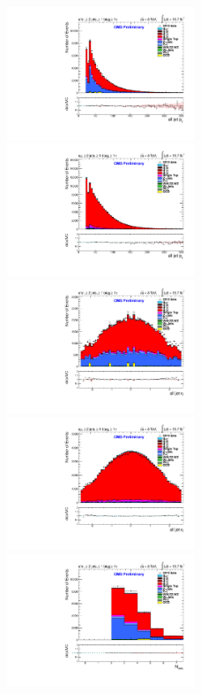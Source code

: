 \documentclass[oneside, a4paper, 11pt, ]{report}
\begin{document}
\begin{figure}
\includegraphics[width=0.5\textwidth]{Plots/ControlPlots/TTbarDiLeptonAnalysis/EE/Jets/all_jet_pT_splitTTbar_ratio.pdf}
\includegraphics[width=0.5\textwidth]{Plots/ControlPlots/TTbarDiLeptonAnalysis/EMu/Jets/all_jet_pT_splitTTbar_ratio.pdf}\\
\includegraphics[width=0.5\textwidth]{Plots/ControlPlots/TTbarDiLeptonAnalysis/EE/Jets/all_jet_eta_splitTTbar_ratio.pdf}
\includegraphics[width=0.5\textwidth]{Plots/ControlPlots/TTbarDiLeptonAnalysis/EMu/Jets/all_jet_eta_splitTTbar_ratio.pdf} \\
\includegraphics[width=0.5\textwidth]{Plots/ControlPlots/TTbarDiLeptonAnalysis/EE/Jets/N_Jets_splitTTbar_ratio.pdf}

\end{figure}
\end{document}
